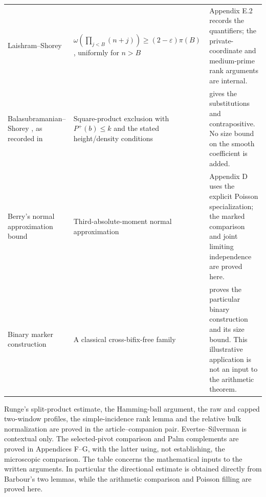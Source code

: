 \begin{longtable}{@{}L{.205\textwidth}L{.30\textwidth}L{.435\textwidth}@{}}
Laishram--Shorey \cite[eq.~(14), p.~331]{LaishramShorey2004}
& $\omega(\prod_{j<B}(n+j))\ge(2-\varepsilon)\pi(B)$, uniformly for $n>B$
& Appendix E.2 records the quantifiers; the private-coordinate and medium-prime rank arguments are internal.\\
Balasubramanian--Shorey \cite{BalasubramanianShorey1993}, as recorded in \cite[pp.~55--56]{Shorey1994BakerApplications}
& Square-product exclusion with $P^+(b)\le k$ and the stated height/density conditions
&  gives the substitutions and contrapositive. No size bound on the smooth coefficient is added.\\
Berry's normal approximation bound \cite{Berry1941}
& Third-absolute-moment normal approximation
& Appendix D uses the explicit Poisson specialization; the marked comparison and joint limiting independence are proved here.\\
Binary marker construction \cite{CheeKiahPurkayasthaWang2013}
& A classical cross-bifix-free family
&  proves the particular binary construction and its size bound. This illustrative application is not an input to the arithmetic theorem.\\
\end{longtable}
\endgroup

\medskip
Runge's split-product estimate, the Hamming-ball argument, the raw and
capped two-window profiles, the simple-incidence rank lemma and the
relative bulk normalization are proved in the article--companion pair.
Evertse--Silverman is contextual only. The selected-pivot comparison and
Palm complements are proved in Appendices F--G, with the latter using,
not establishing, the microscopic comparison. The table concerns the
mathematical inputs to the written arguments. In particular the directional estimate is obtained
directly from Barbour's two lemmas, while the arithmetic comparison and
Poisson filling are proved here.

